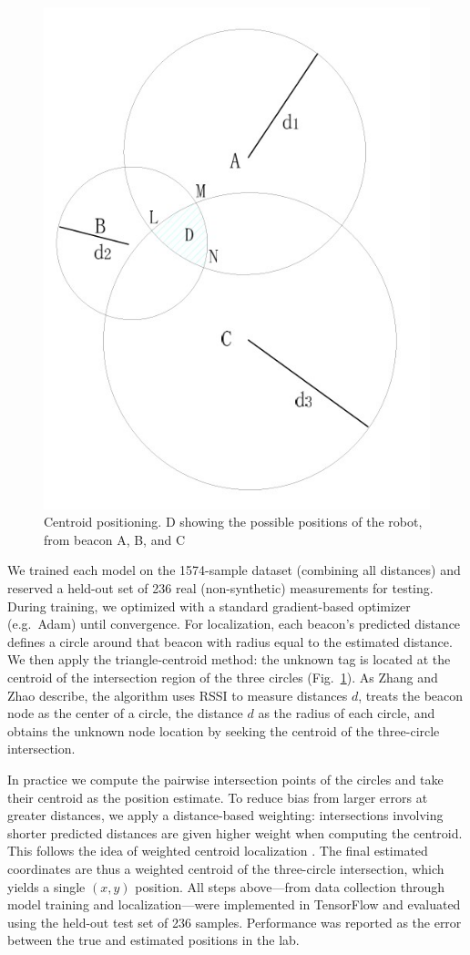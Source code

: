 \begin{figure}[!b]
  \centering
  \includegraphics[width=0.5\linewidth]{img/fig2.jpg}
  \caption{Centroid positioning. D showing the possible positions of the robot, from beacon A, B, and C \cite{WSNCentroid}}
  \label{fig:centroid}
\end{figure}

We trained each model on the 1574-sample dataset (combining all distances) and reserved a held-out set of 236 real (non-synthetic) measurements for testing. During training, we optimized with a standard gradient-based optimizer (e.g.\ Adam) until convergence. For localization, each beacon’s predicted distance defines a circle around that beacon with radius equal to the estimated distance. We then apply the triangle‐centroid method: the unknown tag is located at the centroid of the intersection region of the three circles (Fig.~\ref{fig:centroid}). As Zhang and Zhao \cite{WSNCentroid} describe, the algorithm uses RSSI to measure distances $d$, treats the beacon node as the center of a circle, the distance $d$ as the radius of each circle, and obtains the unknown node location by seeking the centroid of the three-circle intersection. 

In practice we compute the pairwise intersection points of the circles and take their centroid as the position estimate. To reduce bias from larger errors at greater distances, we apply a distance-based weighting: intersections involving shorter predicted distances are given higher weight when computing the centroid. This follows the idea of weighted centroid localization \cite{nagah2021enhanced}. The final estimated coordinates are thus a weighted centroid of the three-circle intersection, which yields a single $(x,y)$ position. All steps above—from data collection through model training and localization—were implemented in TensorFlow and evaluated using the held-out test set of 236 samples. Performance was reported as the error between the true and estimated positions in the lab.

